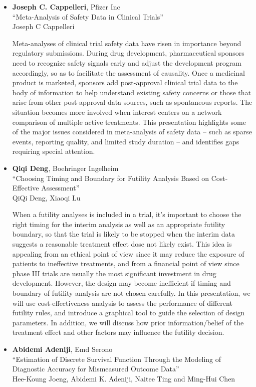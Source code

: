 \begin{itemize}
\item \textbf{Joseph C. Cappelleri}, Pfizer Inc \\
``Meta-Analysis of Safety Data in Clinical Trials'' \\
Joseph C Cappelleri


Meta-analyses of clinical trial safety data have risen in importance beyond regulatory submissions. During drug development, pharmaceutical sponsors need to recognize safety signals early and adjust the development program accordingly, so as to facilitate the assessment of causality. Once a medicinal product is marketed, sponsors add post-approval clinical trial data to the body of information to help understand existing safety concerns or those that arise from other post-approval data sources, such as spontaneous reports. The situation becomes more involved when interest centers on a network comparison of multiple active treatments.  This presentation highlights some of the major issues considered in meta-analysis of safety data – such as sparse events, reporting quality, and limited study duration – and identifies gaps requiring special attention.   

\item \textbf{Qiqi Deng}, Boehringer Ingelheim \\
``Choosing Timing and Boundary for Futility Analysis Based on Cost-Effective Assessment'' \\
QiQi Deng, Xiaoqi Lu


When a futility analyses is included in a trial, it’s important to choose the right timing for the interim analysis as well as an appropriate futility boundary, so that the trial is likely to be stopped when the interim data suggests a reasonable treatment effect dose not likely exist. This idea is appealing from an ethical point of view since it may reduce the exposure of patients to ineffective treatments, and from a financial point of view since phase III trials are usually the most significant investment in drug development. However, the design may become inefficient if timing and boundary of futility analysis are not chosen carefully. In this presentation, we will use cost-effectiveness analysis to assess the performance of different futility rules, and introduce a graphical tool to guide the selection of design parameters. In addition, we will discuss how prior information/belief of the treatment effect and other factors may influence the futility decision.

\item \textbf{Abidemi Adeniji}, Emd Serono \\
``Estimation of Discrete Survival Function Through the Modeling of Diagnostic Accuracy for Mismeasured Outcome Data'' \\
Hee-Koung Joeng, Abidemi K. Adeniji, Naitee Ting and Ming-Hui Chen



\end{itemize}
